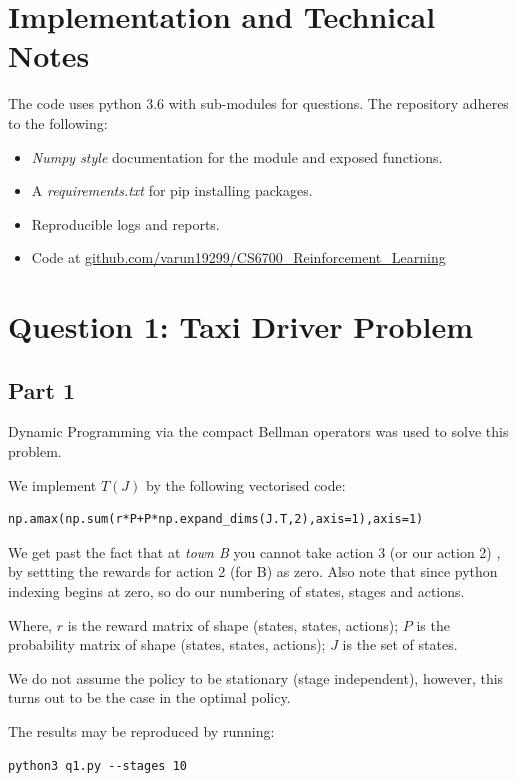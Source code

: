 \section {Implementation and Technical Notes}

The code uses python 3.6 with sub-modules for questions. The repository adheres to the following:
\begin{itemize}
\item \textit{Numpy style} documentation for the module and exposed functions. 
\item A \textit{requirements.txt }for pip installing packages.
\item  Reproducible logs and reports. 
\item Code at \href{https://github.com/varun19299/CS6700_Reinforcement_Learning}{github.com/varun19299/CS6700\_Reinforcement\_Learning}
\end{itemize}

\section {Question 1: Taxi Driver Problem}

\subsection{Part 1}

Dynamic Programming via the compact Bellman operators was used to solve this problem.

We implement $T(J)$ by the following vectorised code:
\begin{lstlisting}[numbers = none]
np.amax(np.sum(r*P+P*np.expand_dims(J.T,2),axis=1),axis=1)
\end{lstlisting}

We get past the fact that at \textit{town B } you cannot take action 3 (or our action 2) , by settting the rewards for action 2 (for B) as zero. Also note that since python indexing begins at zero, so do our numbering of states, stages and actions.

Where, $r$ is the reward matrix of shape (states, states, actions);
$P$ is the probability matrix of shape (states, states, actions);
$J$ is the set of states.

We do not assume the policy to be stationary (stage independent), however, this turns out to be the case in the optimal policy.

The results may be reproduced by running:
\begin{lstlisting}[numbers = none]
python3 q1.py --stages 10
\end{lstlisting}


